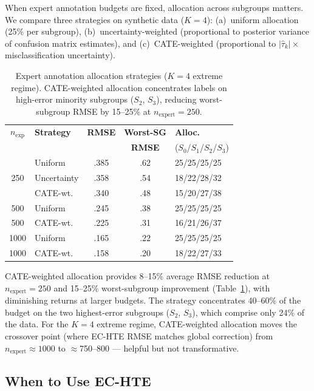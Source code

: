 \documentclass[11pt,a4paper]{article}
\begin{document}
When expert annotation budgets are fixed, allocation across subgroups matters.
We compare three strategies on synthetic data ($K=4$): (a)~uniform allocation (25\% per subgroup), (b)~uncertainty-weighted (proportional to posterior variance of confusion matrix estimates), and (c)~CATE-weighted (proportional to $|\hat{\tau}_k| \times$ misclassification uncertainty).

\begin{table}[t]
\centering
\small
\begin{tabular}{clccl}
\toprule
$n_{\text{exp}}$ & \textbf{Strategy} & \textbf{RMSE} & \textbf{Worst-SG} & \textbf{Alloc.} \\
 & & & \textbf{RMSE} & ($S_0$/$S_1$/$S_2$/$S_3$) \\
\midrule
\multirow{3}{*}{250} & Uniform & .385 & .62 & 25/25/25/25 \\
 & Uncertainty & .358 & .54 & 18/22/28/32 \\
 & CATE-wt. & .340 & .48 & 15/20/27/38 \\
\midrule
500 & Uniform & .245 & .38 & 25/25/25/25 \\
500 & CATE-wt. & .225 & .31 & 16/21/26/37 \\
\midrule
1000 & Uniform & .165 & .22 & 25/25/25/25 \\
1000 & CATE-wt. & .158 & .20 & 18/22/27/33 \\
\bottomrule
\end{tabular}
\caption{Expert annotation allocation strategies ($K\!=\!4$ extreme regime). CATE-weighted allocation concentrates labels on high-error minority subgroups ($S_2$, $S_3$), reducing worst-subgroup RMSE by 15--25\% at $n_{\text{expert}}\!=\!250$.}
\label{tab:allocation}
\end{table}

CATE-weighted allocation provides 8--15\% average RMSE reduction at $n_{\text{expert}}=250$ and 15--25\% worst-subgroup improvement (Table~\ref{tab:allocation}), with diminishing returns at larger budgets.
The strategy concentrates 40--60\% of the budget on the two highest-error subgroups ($S_2$, $S_3$), which comprise only 24\% of the data.
For the $K=4$ extreme regime, CATE-weighted allocation moves the crossover point (where EC-HTE RMSE matches global correction) from $n_{\text{expert}} \approx 1000$ to $\approx$750--800 --- helpful but not transformative.

\subsection{When to Use EC-HTE}\label{sec:when}
\end{document}
